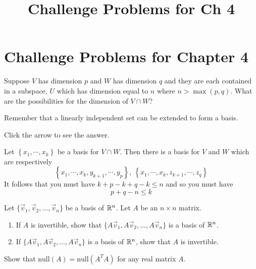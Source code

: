 \documentclass{ximera}
\title{Challenge Problems for Ch 4} \license{CC BY-NC-SA 4.0}
\begin{document}
\begin{abstract}
\end{abstract}
\maketitle

\section*{Challenge Problems for Chapter 4}

\begin{problem}\label{prb:5.29} Suppose $V$ has dimension $p$ and $W$ has dimension $q$ and they
are each contained in a subspace, $U$ which has dimension equal to $n$ where
$n>\max \left( p,q\right).$ What are the possibilities for the dimension of
$V\cap W$? 

\begin{hint}
Remember that a linearly independent set can be extended to form a basis.
\end{hint}

Click the arrow to see the answer.
\begin{expandable}
Let $\left\{ x_{1},\cdots ,x_{k}\right\} $ be a
basis for $V\cap W.$ Then there is a basis for $V$ and $W$ which are
respectively
\[
\left\{ x_{1},\cdots ,x_{k},y_{k+1},\cdots ,y_{p}\right\} ,\ \left\{
x_{1},\cdots ,x_{k},z_{k+1},\cdots ,z_{q}\right\}
\]
It follows that you must have $k+p-k+q-k\leq n$ and so you must have
\[
p+q-n\leq k
\]
\end{expandable}
\end{problem}

\begin{problem}\label{prob:nich6.2}
    Let $\{\vec{v}_1, \vec{v}_2, \dots, \vec{v}_n\}$ be a basis of $\mathbb{R}^n$.  Let $A$ be an $n\times n$ matrix.
    \begin{enumerate}
        \item If $A$ is invertible, show that $\{A\vec{v}_1, A\vec{v}_2, \dots, A\vec{v}_n\}$ is a basis of $\mathbb{R}^n$.
        \item If $\{A\vec{v}_1, A\vec{v}_2, \dots, A\vec{v}_n\}$ is a basis of $\mathbb{R}^n$, show that $A$ is invertible.
    \end{enumerate}
\end{problem}

\begin{problem}\label{prob:nich6.4}
    Show that $\text{null}(A)=\text{null}(A^TA)$ for any real matrix $A$. 
\end{problem}
\end{document}
